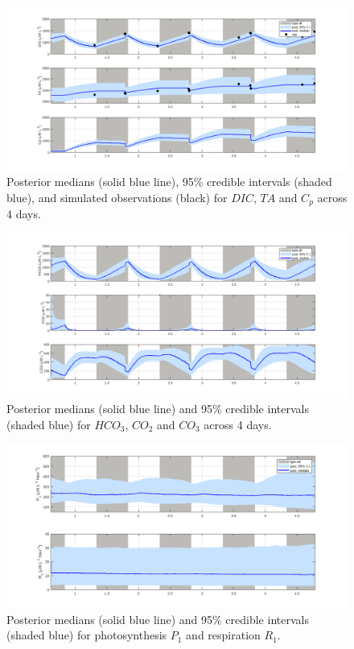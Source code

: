 \documentclass{ruthesis}
\begin{document}
\begin{figure}
	\centerline{\includegraphics[width=1.2\textwidth]{images_microalgae/plots_chris/DIC_TA_Cp}}
	\caption[.]{Posterior medians (solid blue line), 95\% credible intervals (shaded blue), and simulated observations (black) for $DIC$, $TA$ and $C_p$ across 4 days.}
	\label{fig:micro_exp_DIC_TA_Cp}
\end{figure}

\begin{figure}
	\centerline{\includegraphics[width=1.2\textwidth]{images_microalgae/plots_chris/carbon}}
	\caption[.]{Posterior medians (solid blue line) and 95\% credible intervals (shaded blue) for $HCO_3$, $CO_2$ and $CO_3$ across 4 days.}
	\label{fig:micro_exp_carbon}
\end{figure}

\begin{figure}
	\centerline{\includegraphics[width=1.2\textwidth]{images_microalgae/plots_chris/P_and_R}}
	\caption[.]{Posterior medians (solid blue line) and 95\% credible intervals (shaded blue) for photosynthesis $P_1$ and respiration $R_1$.}
	\label{fig:micro_exp_P_R}
\end{figure}
\end{document}
